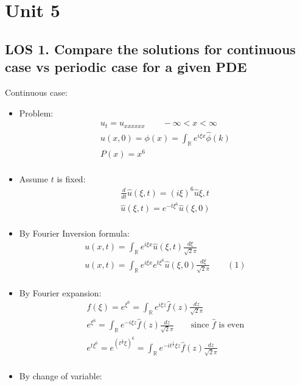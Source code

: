 \documentclass[12pt, a4paper]{article}
\begin{document}
\section*{Unit 5}
\vspace{1em}

\subsection*{LOS 1. Compare the solutions for continuous case vs periodic case for a given PDE}
Continuous case:
\begin{itemize}
    \item Problem: 
    \begin{gather*}
        u_t = u_{xxxxxx} \qquad -\infty < x < \infty\\
        u(x, 0) = \phi(x) = \int_{\mathbb{R}} e^{i\xi x}\hat{\phi}(k)\\
        P(x) = x^6\\
    \end{gather*}
    \item Assume $t$ is fixed:
    \begin{gather*}
        \frac{d}{dt} \hat{u}(\xi, t) =(i\xi)^6\hat{u}{\xi, t} \\
        \hat{u}(\xi, t) = e^{-t\xi^6}\hat{u}(\xi, 0) \\
    \end{gather*}
    \item By Fourier Inversion formula:
    \begin{gather*}
        u(x, t) = \int_{\mathbb{R}} e^{i\xi x}\hat{u}(\xi, t)\frac{d\xi}{\sqrt{2}\pi}\\
        u(x, t) = \int_{\mathbb{R}} e^{i\xi x}e^{t\xi^6}\hat{u}(\xi, 0)\frac{d\xi}{\sqrt{2}\pi} \qquad (1)\\
    \end{gather*}
    \item By Fourier expansion:
    \begin{gather*}
        f(\xi) = e^{\xi^6} = \int_{\mathbb{R}} e^{i\xi z}\hat{f}(z)\frac{dz}{\sqrt{2}\pi}\\
        e^{\xi^6} = \int_{\mathbb{R}} e^{-i\xi z}\hat{f}(z)\frac{dz}{\sqrt{2}\pi} \qquad \text{since $\hat{f}$ is even}\\
        e^{t\xi^6} = e^{(t^{\frac{1}{6}}\xi)^6} = \int_{\mathbb{R}} e^{-it^{\frac{1}{6}}\xi z}\hat{f}(z)\frac{dz}{\sqrt{2}\pi}\\
    \end{gather*}
    \item By change of variable:

\end{itemize}
\end{document}
